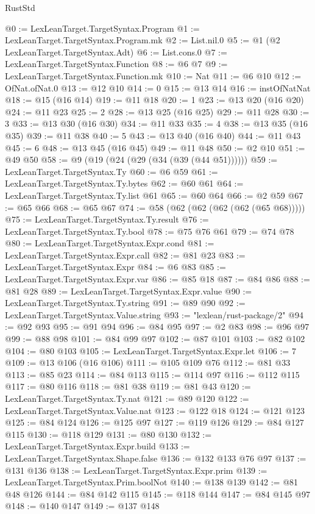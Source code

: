 \begin{lexlean}{RustStd}
\begin{coremodule}
@0 := LexLeanTarget.TargetSyntax.Program
@1 := LexLeanTarget.TargetSyntax.Program.mk
@2 := List.nil.{0}
@5 := @1 (@2 LexLeanTarget.TargetSyntax.Adt)
@6 := List.cons.{0}
@7 := LexLeanTarget.TargetSyntax.Function
@8 := @6 @7
@9 := LexLeanTarget.TargetSyntax.Function.mk
@10 := Nat
@11 := @6 @10
@12 := OfNat.ofNat.{0}
@13 := @12 @10
@14 := 0
@15 := @13 @14
@16 := instOfNatNat
@18 := @15 (@16 @14)
@19 := @11 @18
@20 := 1
@23 := @13 @20 (@16 @20)
@24 := @11 @23
@25 := 2
@28 := @13 @25 (@16 @25)
@29 := @11 @28
@30 := 3
@33 := @13 @30 (@16 @30)
@34 := @11 @33
@35 := 4
@38 := @13 @35 (@16 @35)
@39 := @11 @38
@40 := 5
@43 := @13 @40 (@16 @40)
@44 := @11 @43
@45 := 6
@48 := @13 @45 (@16 @45)
@49 := @11 @48
@50 := @2 @10
@51 := @49 @50
@58 := @9 (@19 (@24 (@29 (@34 (@39 (@44 @51))))))
@59 := LexLeanTarget.TargetSyntax.Ty
@60 := @6 @59
@61 := LexLeanTarget.TargetSyntax.Ty.bytes
@62 := @60 @61
@64 := LexLeanTarget.TargetSyntax.Ty.list @61
@65 := @60 @64
@66 := @2 @59
@67 := @65 @66
@68 := @65 @67
@74 := @58 (@62 (@62 (@62 (@62 (@65 @68)))))
@75 := LexLeanTarget.TargetSyntax.Ty.result
@76 := LexLeanTarget.TargetSyntax.Ty.bool
@78 := @75 @76 @61
@79 := @74 @78
@80 := LexLeanTarget.TargetSyntax.Expr.cond
@81 := LexLeanTarget.TargetSyntax.Expr.call
@82 := @81 @23
@83 := LexLeanTarget.TargetSyntax.Expr
@84 := @6 @83
@85 := LexLeanTarget.TargetSyntax.Expr.var
@86 := @85 @18
@87 := @84 @86
@88 := @81 @28
@89 := LexLeanTarget.TargetSyntax.Expr.value
@90 := LexLeanTarget.TargetSyntax.Ty.string
@91 := @89 @90
@92 := LexLeanTarget.TargetSyntax.Value.string
@93 := "lexlean/rust-package/2"
@94 := @92 @93
@95 := @91 @94
@96 := @84 @95
@97 := @2 @83
@98 := @96 @97
@99 := @88 @98
@101 := @84 @99 @97
@102 := @87 @101
@103 := @82 @102
@104 := @80 @103
@105 := LexLeanTarget.TargetSyntax.Expr.let
@106 := 7
@109 := @13 @106 (@16 @106)
@111 := @105 @109 @76
@112 := @81 @33
@113 := @85 @23
@114 := @84 @113
@115 := @114 @97
@116 := @112 @115
@117 := @80 @116
@118 := @81 @38
@119 := @81 @43
@120 := LexLeanTarget.TargetSyntax.Ty.nat
@121 := @89 @120
@122 := LexLeanTarget.TargetSyntax.Value.nat
@123 := @122 @18
@124 := @121 @123
@125 := @84 @124
@126 := @125 @97
@127 := @119 @126
@129 := @84 @127 @115
@130 := @118 @129
@131 := @80 @130
@132 := LexLeanTarget.TargetSyntax.Expr.build
@133 := LexLeanTarget.TargetSyntax.Shape.false
@136 := @132 @133 @76 @97
@137 := @131 @136
@138 := LexLeanTarget.TargetSyntax.Expr.prim
@139 := LexLeanTarget.TargetSyntax.Prim.boolNot
@140 := @138 @139
@142 := @81 @48 @126
@144 := @84 @142 @115
@145 := @118 @144
@147 := @84 @145 @97
@148 := @140 @147
@149 := @137 @148

\end{coremodule}
\end{lexlean}
